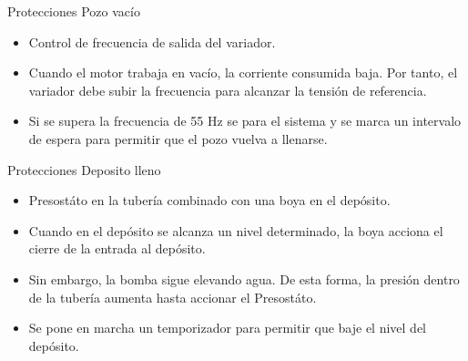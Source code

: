 \documentclass[xcolor={usenames,svgnames,dvipsnames}]{beamer}
\begin{document}
\begin{frame}[label=sec-3-0-6]{Protecciones}
Pozo vacío

\begin{itemize}
\item \alert{Control de frecuencia de salida del variador}.

\item Cuando el motor trabaja en vacío, la corriente consumida baja. Por
tanto, el variador debe subir la frecuencia para alcanzar la tensión
de referencia.

\item Si se supera la frecuencia de 55 Hz se para el sistema y se marca un
intervalo de espera para permitir que el pozo vuelva a llenarse.
\end{itemize}
\end{frame}

\begin{frame}[label=sec-3-0-7]{Protecciones}
Deposito lleno

\begin{itemize}
\item \alert{Presostáto en la tubería combinado con una boya en el depósito}.

\item Cuando en el depósito se alcanza un nivel determinado, la boya
acciona el cierre de la entrada al depósito.

\item Sin embargo, la bomba sigue elevando agua. De esta forma, la presión
dentro de la tubería aumenta hasta accionar el Presostáto.

\item Se pone en marcha un temporizador para permitir que baje el nivel del
depósito.
\end{itemize}
\end{frame}
\end{document}

